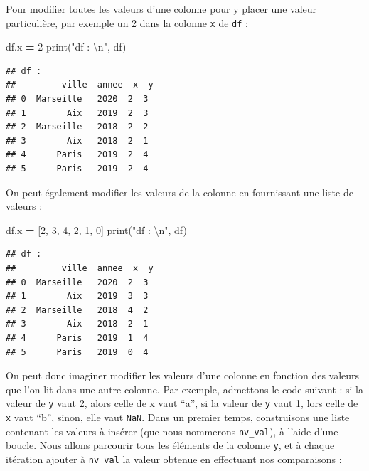 \documentclass[12pt,]{book}
\newenvironment{Shaded}{\begin{snugshade}}{\end{snugshade}}
\newcommand{\DecValTok}[1]{\textcolor[rgb]{0.00,0.00,0.81}{#1}}
\newcommand{\CharTok}[1]{\textcolor[rgb]{0.31,0.60,0.02}{#1}}
\newcommand{\StringTok}[1]{\textcolor[rgb]{0.31,0.60,0.02}{#1}}
\newcommand{\OperatorTok}[1]{\textcolor[rgb]{0.81,0.36,0.00}{\textbf{#1}}}
\newcommand{\BuiltInTok}[1]{#1}
\newcommand{\NormalTok}[1]{#1}
\numberwithin{equation}{section}
\numberwithin{countremarque}{section}
\begin{document}
Pour modifier toutes les valeurs d'une colonne pour y placer une valeur
particulière, par exemple un 2 dans la colonne \texttt{x} de \texttt{df}
:

\begin{Shaded}
\begin{Highlighting}[]
\NormalTok{df.x }\OperatorTok{=} \DecValTok{2}
\BuiltInTok{print}\NormalTok{(}\StringTok{"df : }\CharTok{\textbackslash{}n}\StringTok{"}\NormalTok{, df)}
\end{Highlighting}
\end{Shaded}

\begin{lstlisting}
## df : 
##         ville  annee  x  y
## 0  Marseille   2020  2  3
## 1        Aix   2019  2  3
## 2  Marseille   2018  2  2
## 3        Aix   2018  2  1
## 4      Paris   2019  2  4
## 5      Paris   2019  2  4
\end{lstlisting}

On peut également modifier les valeurs de la colonne en fournissant une
liste de valeurs :

\begin{Shaded}
\begin{Highlighting}[]
\NormalTok{df.x }\OperatorTok{=}\NormalTok{ [}\DecValTok{2}\NormalTok{, }\DecValTok{3}\NormalTok{, }\DecValTok{4}\NormalTok{, }\DecValTok{2}\NormalTok{, }\DecValTok{1}\NormalTok{, }\DecValTok{0}\NormalTok{]}
\BuiltInTok{print}\NormalTok{(}\StringTok{"df : }\CharTok{\textbackslash{}n}\StringTok{"}\NormalTok{, df)}
\end{Highlighting}
\end{Shaded}

\begin{lstlisting}
## df : 
##         ville  annee  x  y
## 0  Marseille   2020  2  3
## 1        Aix   2019  3  3
## 2  Marseille   2018  4  2
## 3        Aix   2018  2  1
## 4      Paris   2019  1  4
## 5      Paris   2019  0  4
\end{lstlisting}

On peut donc imaginer modifier les valeurs d'une colonne en fonction des
valeurs que l'on lit dans une autre colonne. Par exemple, admettons le
code suivant : si la valeur de \texttt{y} vaut 2, alors celle de x vaut
``a'', si la valeur de \texttt{y} vaut 1, lors celle de \texttt{x} vaut
``b'', sinon, elle vaut \texttt{NaN}. Dans un premier temps,
construisons une liste contenant les valeurs à insérer (que nous
nommerons \texttt{nv\_val}), à l'aide d'une boucle. Nous allons
parcourir tous les éléments de la colonne \texttt{y}, et à chaque
itération ajouter à \texttt{nv\_val} la valeur obtenue en effectuant nos
comparaisons :
\end{document}
